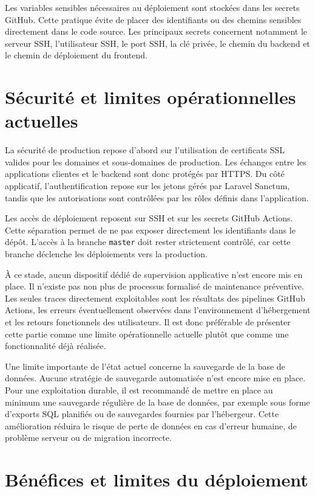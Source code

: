 Les variables sensibles nécessaires au déploiement sont stockées dans les secrets GitHub. Cette pratique évite de placer des identifiants ou des chemins sensibles directement dans le code source. Les principaux secrets concernent notamment le serveur SSH, l'utilisateur SSH, le port SSH, la clé privée, le chemin du backend et le chemin de déploiement du frontend.

\section{Sécurité et limites opérationnelles actuelles}

La sécurité de production repose d'abord sur l'utilisation de certificats SSL valides pour les domaines et sous-domaines de production. Les échanges entre les applications clientes et le backend sont donc protégés par HTTPS. Du côté applicatif, l'authentification repose sur les jetons gérés par Laravel Sanctum, tandis que les autorisations sont contrôlées par les rôles définis dans l'application.

Les accès de déploiement reposent sur SSH et sur les secrets GitHub Actions. Cette séparation permet de ne pas exposer directement les identifiants dans le dépôt. L'accès à la branche \texttt{master} doit rester strictement contrôlé, car cette branche déclenche les déploiements vers la production.

À ce stade, aucun dispositif dédié de supervision applicative n'est encore mis en place. Il n'existe pas non plus de processus formalisé de maintenance préventive. Les seules traces directement exploitables sont les résultats des pipelines GitHub Actions, les erreurs éventuellement observées dans l'environnement d'hébergement et les retours fonctionnels des utilisateurs. Il est donc préférable de présenter cette partie comme une limite opérationnelle actuelle plutôt que comme une fonctionnalité déjà réalisée.

Une limite importante de l'état actuel concerne la sauvegarde de la base de données. Aucune stratégie de sauvegarde automatisée n'est encore mise en place. Pour une exploitation durable, il est recommandé de mettre en place au minimum une sauvegarde régulière de la base de données, par exemple sous forme d'exports SQL planifiés ou de sauvegardes fournies par l'hébergeur. Cette amélioration réduira le risque de perte de données en cas d'erreur humaine, de problème serveur ou de migration incorrecte.

\section{Bénéfices et limites du déploiement}

